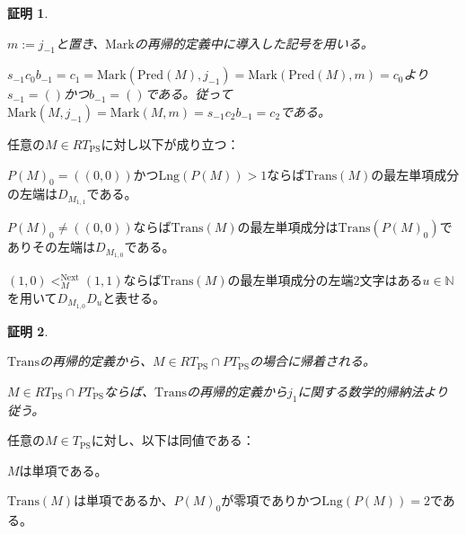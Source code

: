 \documentclass[dvipdfmx,uplatex]{jsarticle}
\theoremstyle{customnonumberbreakfortheorem}
\theoremstyle{customnonumberbreakforproof}
\newtheorem{hideableproof}{証明}
\begin{document}
\begin{hideableproof}
	\begin{indented}
		\item \(m := j_{-1}\)と置き、\(\textrm{Mark}\)の再帰的定義中に導入した記号を用いる。
		\item \(s_{-1} c_0 b_{-1} = c_1 = \textrm{Mark}(\textrm{Pred}(M),j_{-1}) = \textrm{Mark}(\textrm{Pred}(M),m) = c_0\)より\(s_{-1} = ()\)かつ\(b_{-1} = ()\)である。従って\(\textrm{Mark}(M,j_{-1}) = \textrm{Mark}(M,m) = s_{-1} c_2 b_{-1} = c_2\)である。
	\end{indented}
\end{hideableproof}

\begin{proposition}\label{Transの最左単項成分の左端の基本性質}
	任意の\(M \in RT_{\textrm{PS}}\)に対し以下が成り立つ：
	\begin{penumerate}
		\item \(P(M)_0 = ((0,0))\)かつ\(\textrm{Lng}(P(M)) > 1\)ならば\(\textrm{Trans}(M)\)の最左単項成分の左端は\(D_{M_{1,1}}\)である。
		\item \(P(M)_0 \neq ((0,0))\)ならば\(\textrm{Trans}(M)\)の最左単項成分は\(\textrm{Trans}(P(M)_0)\)でありその左端は\(D_{M_{1,0}}\)である。
		\item \((1,0) <_M^{\textrm{Next}} (1,1)\)ならば\(\textrm{Trans}(M)\)の最左単項成分の左端\(2\)文字はある\(u \in \mathbb{N}\)を用いて\(D_{M_{1,0}} D_u\)と表せる。
	\end{penumerate}
\end{proposition}

\begin{hideableproof}
	\begin{indented}
		\item \(\textrm{Trans}\)の再帰的定義から、\(M \in RT_{\textrm{PS}} \cap PT_{\textrm{PS}}\)の場合に帰着される。
		\item \(M \in RT_{\textrm{PS}} \cap PT_{\textrm{PS}}\)ならば、\(\textrm{Trans}\)の再帰的定義から\(j_1\)に関する数学的帰納法より従う。
	\end{indented}
\end{hideableproof}

\begin{proposition}\label{Transが単項性を保つこと}
	任意の\(M \in T_{\textrm{PS}}\)に対し、以下は同値である：
	\begin{penumerate}
		\item \(M\)は単項である。
		\item \(\textrm{Trans}(M)\)は単項であるか、\(P(M)_0\)が零項でありかつ\(\textrm{Lng}(P(M)) = 2\)である。
	\end{penumerate}
\end{proposition}
\end{document}
